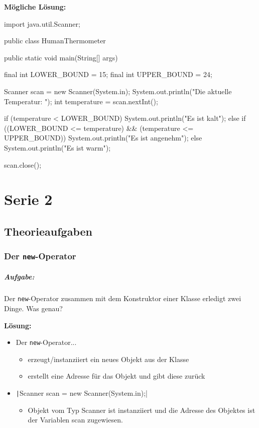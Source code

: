 \documentclass[a4paper,10pt, dvipsnames]{report}
\begin{document}
\textbf{Mögliche Lösung:}

\begin{javacodebox}
import java.util.Scanner;

public class HumanThermometer {
    public static void main(String[] args) {
		final int LOWER_BOUND = 15;
		final int UPPER_BOUND = 24;
		
		Scanner scan = new Scanner(System.in);
		System.out.println("Die aktuelle Temperatur: ");
		int temperature = scan.nextInt();
		
		if (temperature < LOWER_BOUND) {
			System.out.println("Es ist kalt");
		} 
		else if ((LOWER_BOUND <= temperature) && (temperature <= UPPER_BOUND)) {
			System.out.println("Es ist angenehm");
		} 
		else
			System.out.println("Es ist warm");
		
		scan.close();
	}
}
\end{javacodebox}

\chapter{Serie 2}
\section{Theorieaufgaben}
\subsection{Der \texttt{new}-Operator}

\paragraph{Aufgabe:} 
Der \texttt{new}-Operator zusammen mit dem Konstruktor einer Klasse erledigt zwei Dinge. Was genau?

\textbf{Lösung:}

\begin{itemize}
    \item Der \texttt{new}-Operator...
    \begin{itemize}
        \item  erzeugt/instanziiert ein neues Objekt aus der Klasse
        \item erstellt eine Adresse für das Objekt und gibt diese zurück
    \end{itemize}
    \item \texttt|Scanner scan = new Scanner(System.in);|
    \begin{itemize}
        \item Objekt vom Typ Scanner ist instanziiert und die Adresse des Objektes ist der Variablen scan zugewiesen.
    \end{itemize}
\end{itemize}
\end{document}
